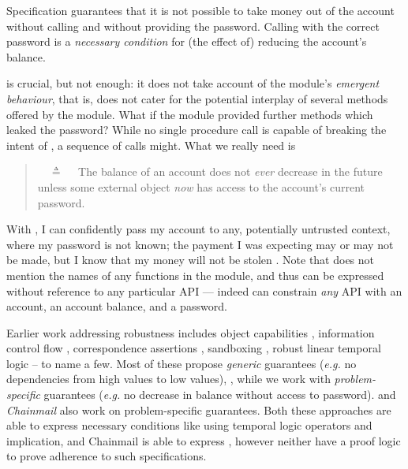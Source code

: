 Specification \SrobustA %
{guarantees} that it is not possible to  take money out of the account 
{without calling  and} without providing the password.
  Calling    with the  correct password is 
a \emph{necessary condition} for {(the effect of)} reducing the account's  balance.

\SrobustA is  crucial, but  not   enough:
it does not take  account of the module's \emph{emergent behaviour},
{that is, does not cater for the potential interplay of several methods offered by the module.}
 What if the module provided further methods which leaked the password?  
{ While no single procedure call is capable of breaking the intent of \SrobustA, a sequence of calls might.}
{What} we really need is
 \begin{quote}
\SrobustB\ \ $\triangleq$ \ \ The balance of an account does not {\emph{ever}} decrease in the future unless some external 
object  {\emph{now}} has access to the account's current password.
\end{quote}
With \SrobustB, I can confidently pass my account to  {any, potentially untrusted context, where my password is not known;} 
 {the payment I was expecting may or may not be made,}
but I know 
 {that my money will not be stolen} \cite{ooToSecurity}. 
 Note that \SrobustB  does not mention
 the names of any functions in the module, and 
 thus can be expressed without reference to any particular API ---
 indeed \SrobustB can constrain \emph{any} API with an account, an account
 balance, and a password.

 
{Earlier work addressing robustness} includes object capabilities  \cite{MillerPhD, dd, threoremsFreeSep}, 
information control flow \cite{Zdancewic:Myers:01,noninteferenceOS}, 
 correspondence assertions \cite{Maffeis:aiamb:thesis00},
 sandboxing  \cite{robustSafetyPatrignani,sandbox},
robust linear temporal logic   \cite{RLTL2022} -- to name a few. %
{Most of these  %
propose \emph{generic}  guarantees (\emph{e.g.} no dependencies from high values to low values),
,
while we work with  \emph{problem-specific}  guarantees   (\emph{e.g.} no decrease in balance without access to password).}
{{{} \cite{VerX} and  \emph{Chainmail} \cite{FASE} also work on problem-specific guarantees.}
Both these approaches are able to express necessary conditions
  like \SrobustA using
  temporal logic operators and implication,
  and Chainmail is able to express \SrobustB,
  however neither have a proof logic
   to prove adherence to such specifications.}
%







